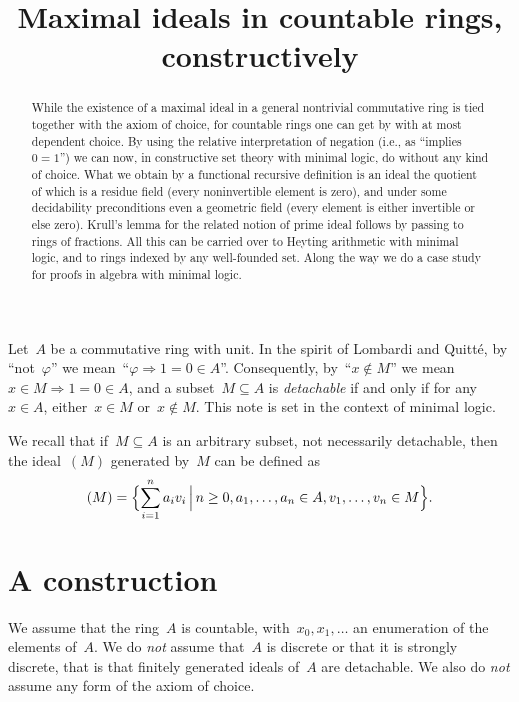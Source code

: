 \documentclass[oneside,reqno]{amsart}
\title{Maximal ideals in countable rings, constructively}
\author{}
\theoremstyle{definition}
\theoremstyle{plain}
\theoremstyle{remark}
\renewcommand{\_}{\mathpunct{.}\,}
\begin{document}
\begin{abstract}
  While the existence of a maximal ideal in a general nontrivial commutative
  ring is tied together with the axiom of choice, for countable rings one can
  get by with at most dependent choice. By using the relative interpretation of
  negation (i.e., as ``implies~$0=1$'') we can now, in constructive set theory with
  minimal logic, do without any kind of choice. What we obtain by a functional
  recursive definition is an ideal the quotient of which is a residue field
  (every noninvertible element is zero), and under some decidability
  preconditions even a geometric field (every element is either invertible or
  else zero). Krull's lemma for the related notion of prime ideal follows by
  passing to rings of fractions. All this can be carried over to Heyting
  arithmetic with minimal logic, and to rings indexed by any well-founded set.
  Along the way we do a case study for proofs in algebra with minimal logic.
\end{abstract}


\maketitle
\thispagestyle{empty}


Let~$A$ be a commutative ring with unit. In the spirit of Lombardi and Quitté,
by ``not~$\varphi$'' we mean~``$\varphi \Rightarrow 1 = 0 \in A$''. Consequently,
by~``$x \not\in M$'' we mean~$x \in M \Rightarrow 1 = 0 \in A$, and a subset~$M
\subseteq A$ is \emph{detachable} if and only if for any~$x \in A$, either~$x \in M$
or~$x \not\in M$. This note is set in the context of minimal logic.

We recall that if~$M \subseteq A$ is an arbitrary subset, not necessarily
detachable, then the ideal~$(M)$ generated by~$M$ can be defined
as \[ (M) = \Bigl\{ \sum_{i=1}^n a_i v_i \,\Big|\, n \geq 0, a_1,\ldots,a_n \in
A, v_1,\ldots,v_n \in M \Bigr\}. \]


\section{A construction}
\label{sect:constr}

We assume that the ring~$A$ is countable, with~$x_0, x_1, \ldots$ an
enumeration of the elements of~$A$. We do \emph{not} assume that~$A$ is
discrete or that it is strongly discrete, that is that finitely generated
ideals of~$A$ are detachable. We also do
\emph{not} assume any form of the axiom of choice.
\end{document}
